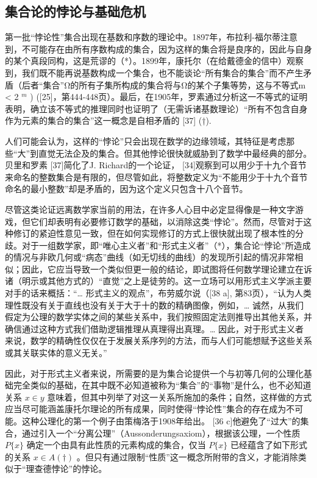 \subsection*{集合论的悖论与基础危机}

第一批“悖论性”集合出现在基数和序数的理论中。1897年，布拉利-福尔蒂注意到，不可能存在由所有序数构成的集合，因为这样的集合将是良序的，因此与自身的某个真段同构，这是荒谬的（*）。1899年，康托尔（在给戴德金的信中）观察到，我们既不能再说基数构成一个集合，也不能谈论“所有集合的集合”而不产生矛盾（后者“集合”Ω的所有子集所构成的集合将与Ω的某个子集等势，这与不等式m \textless{} 2 \(^{m}\) ) ({[}25{]}，第444-448页）。最后，在1905年，罗素通过分析这一不等式的证明表明，确立该不等式的推理同时也证明了（无需诉诸基数理论）“所有不包含自身作为元素的集合的集合”这一概念是自相矛盾的 {[}37{]} (†).

人们可能会认为，这样的“悖论”只会出现在数学的边缘领域，其特征是考虑那些“大”到直觉无法企及的集合。但其他悖论很快就威胁到了数学中最经典的部分。贝里和罗素 {[}37{]}简化了J. Richard的一个论证， {[}34{]}观察到可以用少于十九个音节来命名的整数集合是有限的，但尽管如此，将整数定义为“不能用少于十九个音节命名的最小整数”却是矛盾的，因为这个定义只包含十八个音节。

尽管这类论证远离数学家当前的用法，在许多人心目中必定显得像是一种文字游戏，但它们却表明有必要修订数学的基础，以消除这类“悖论”。然而，尽管对于这种修订的紧迫性意见一致，但在如何实现修订的方式上很快就出现了根本性的分歧。对于一组数学家，即“唯心主义者”和“形式主义者”（*），集合论“悖论”所造成的情况与非欧几何或“病态”曲线（如无切线的曲线）的发现所引起的情况非常相似；因此，它应当导致一个类似但更一般的结论，即试图将任何数学理论建立在诉诸（明示或其他方式的）“直觉”之上是徒劳的。这一立场可以用形式主义学派主要对手的话来概括：“\ldots{} 形式主义的观点”，布劳威尔说（{[}38 a{]}, 第83页），“认为人类理性既没有关于直线也没有关于大于十的数的精确图像，例如，\ldots{} 诚然，从我们假定为公理的数学实体之间的某些关系中，我们按照固定法则推导出其他关系，并确信通过这种方式我们借助逻辑推理从真理得出真理。\ldots{} 因此，对于形式主义者来说，数学的精确性仅仅在于发展关系序列的方法，而与人们可能想赋予这些关系或其关联实体的意义无关。”

因此，对于形式主义者来说，所需要的是为集合论提供一个与初等几何的公理化基础完全类似的基础，在其中既不必知道被称为“集合”的“事物”是什么，也不必知道关系 \(x \in y\) 意味着，但其中列举了对这一关系所施加的条件；自然，这样做的方式应当尽可能涵盖康托尔理论的所有成果，同时使得“悖论性”集合的存在成为不可能。这种公理化的第一个例子由策梅洛于1908年给出。 {[}36 c{]}他避免了“过大”的集合，通过引入一个“分离公理”（Aussonderungsaxiom），根据该公理，一个性质 \(P\{x\}\) 确定一个由具有此性质的元素构成的集合，仅当 \(P\{x\}\) 已经蕴含了如下形式的关系 \(x \in A (\dagger)\) 。但只有通过限制“性质”这一概念所附带的含义，才能消除类似于“理查德悖论”的悖论。


